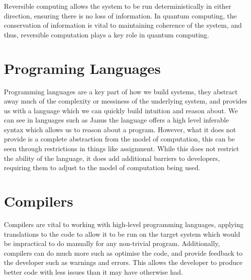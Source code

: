 Reversible computing allows the system to be run deterministically in either direction, ensuring there is no loss of information.
In quantum computing, the conservation of information is vital to maintaining coherence of the system, and thus, reversible computation plays a key role in quantum computing.

\section{Programing Languages}\label{sec:programing-languages}
Programming languages are a key part of how we build systems, they abstract away much of the complexity or messiness of the underlying system, and provides us with a language which we can quickly build intuition and reason about.
We can see in languages such as Janus\cite{lutz_janus_1986} the language offers a high level inferable syntax which allows us to reason about a program.
However, what it does not provide is a complete abstraction from the model of computation, this can be seen through restrictions in things like assignment.
While this does not restrict the ability of the language, it does add additional barriers to developers, requiring them to adjust to the model of computation being used.

\section{Compilers}\label{sec:compilers}
Compilers are vital to working with high-level programming languages, applying translations to the code to allow it to be run on the target system which would be impractical to do manually for any non-trivial program.
Additionally, compilers can do much more such as optimise the code, and provide feedback to the developer such as warnings and errors.
This allows the developer to produce better code with less issues than it may have otherwise had.


